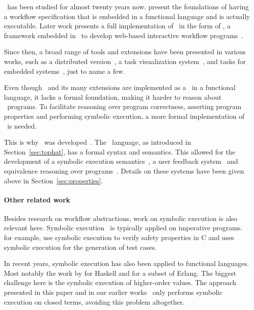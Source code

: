 \TOP\ has been studied for almost twenty years now.
\citet{conf/icfp/PlasmeijerAK07} present the foundations of having a workflow specification that is embedded in a functional language and is actually executable.
Later work presents a full implementation of \TOP\ in the form of \ITASKS, a framework embedded in \CLEAN\ to develop web-based interactive workflow programs~\cite{conf/ppdp/PlasmeijerLMAK12}.

Since then, a broad range of tools and extensions have been presented in various works, such as a distributed version~\cite{conf/ifl/OortgieseGAP17}, a task visualization system~\cite{conf/sfp/StutterheimPA14,conf/cefp/StutterheimAP15}, and tasks for embedded systems~\cite{conf/cgo/KoopmanLP18,conf/ifl/LubbersKP18,conf/mipro/LubbersKP19,conf/ifl/LubbersKP19}, just to name a few.

Even though \ITASKS\ and its many extensions are implemented as a \DSL\ in a functional language, it lacks a formal foundation, making it harder to reason about \TOP\ programs.
To facilitate reasoning over program correctness, asserting program properties and performing symbolic execution, a more formal implementation of \TOP\ is needed.

This is why \TOPHAT\ was developed~\cite{conf/ppdp/SteenvoordenNK19}.
The \TOPHAT\ language, as introduced in Section~\ref{sec:tophat}, has a formal syntax and semantics.
This allowed for the development of a symbolic execution semantics~\cite{conf/ifl/NausSK19}, a user feedback system~\cite{conf/sfp/NausS20} and equivalence reasoning over programs~\cite{conf/sfp/KlijnsmaS22}.
Details on these systems have been given above in Section~\ref{sec:properties}.

\paragraph{Other related work}

Besides research on workflow abstractions, work on symbolic execution is also relevant here.
Symbolic execution~\cite{Boyer1975,conf/relsoft/King75} is typically applied on imperative programs.
\citet*{JaffarMNS2012} for example, use symbolic execution to verify safety properties in C and
\citet*{CadarDE2008} uses symbolic execution for the generation of test cases.

In recent years, symbolic execution has also been applied to functional languages.
Most notably the work by \citet*{HallahanXP2017,conf/pldi/HallahanXBJP19} for Haskell and \citet*{GiantsiosPS2017} for a subset of Erlang.
The biggest challenge here is the symbolic execution of higher-order values.
The approach presented in this paper and in our earlier works~\cite{conf/sfp/NausS20} only performs symbolic execution on closed terms, avoiding this problem altogether.
